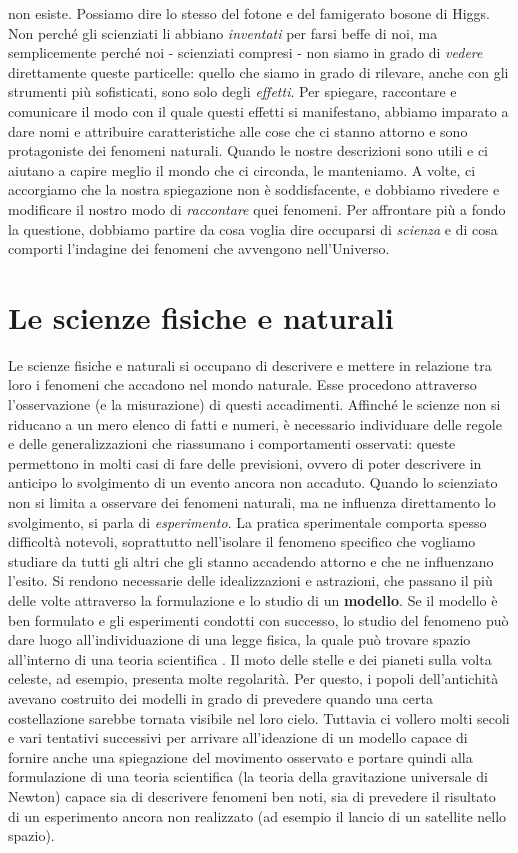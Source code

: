  non esiste. Possiamo dire lo stesso del fotone e del famigerato bosone di Higgs.
Non perché gli scienziati li abbiano \emph{inventati} per farsi beffe di noi, ma semplicemente
perché noi - scienziati compresi - non siamo in grado di \emph{vedere} direttamente queste
particelle: quello che siamo in grado di rilevare, anche con gli strumenti più sofisticati,
sono solo degli \emph{effetti}. Per spiegare, raccontare e comunicare il modo con il quale questi
effetti si manifestano, abbiamo imparato a dare nomi e attribuire caratteristiche alle
cose che ci stanno attorno e sono protagoniste dei fenomeni naturali. Quando le nostre
descrizioni sono utili e ci aiutano a capire meglio il mondo che ci circonda, le manteniamo. A volte,
ci accorgiamo che la nostra spiegazione non è soddisfacente, e dobbiamo rivedere e modificare
il nostro modo di \emph{raccontare} quei fenomeni.
Per affrontare più a fondo la questione,
dobbiamo partire da cosa voglia dire occuparsi di \emph{scienza} e di cosa
comporti l'indagine dei fenomeni che avvengono nell'Universo.

\section*{Le scienze fisiche e naturali}
Le scienze fisiche e naturali si occupano di descrivere e mettere in relazione tra loro i 
fenomeni che accadono nel mondo naturale. Esse procedono attraverso l'osservazione (e la misurazione)
di questi accadimenti.
Affinché le scienze non si riducano a un mero elenco di fatti e numeri, è necessario 
individuare delle regole e delle generalizzazioni che riassumano i comportamenti osservati: 
queste permettono in molti casi di fare delle previsioni, ovvero di poter descrivere in anticipo
lo svolgimento di un evento ancora non accaduto.
Quando lo scienziato non si limita a osservare dei fenomeni naturali, ma ne influenza
direttamento lo svolgimento, si parla di \emph{esperimento}. La pratica sperimentale comporta 
spesso difficoltà notevoli, soprattutto nell'isolare il fenomeno specifico che vogliamo 
studiare da tutti gli altri che gli stanno accadendo attorno e che ne influenzano l'esito. 
Si rendono necessarie delle idealizzazioni e astrazioni, che passano il più delle volte attraverso la formulazione e lo studio di un \textbf{modello}. 
Se il modello è ben formulato e gli esperimenti condotti con successo, lo studio del fenomeno può
dare luogo all'individuazione di una legge fisica, la quale può trovare spazio all'interno 
di una teoria scientifica \cite{encb}.
Il moto delle stelle e dei pianeti sulla volta celeste, ad esempio, presenta molte regolarità. 
Per questo, i popoli dell'antichità avevano costruito dei modelli in grado di prevedere quando 
una certa costellazione sarebbe tornata visibile nel loro cielo. Tuttavia ci vollero molti secoli 
e vari tentativi successivi per arrivare all'ideazione di un modello capace di fornire anche 
una spiegazione del movimento osservato e portare quindi alla formulazione di una teoria 
scientifica (la teoria della gravitazione universale di Newton) capace sia di descrivere fenomeni 
ben noti, sia di prevedere il risultato di un esperimento ancora non realizzato 
(ad esempio il lancio di un satellite nello spazio).

